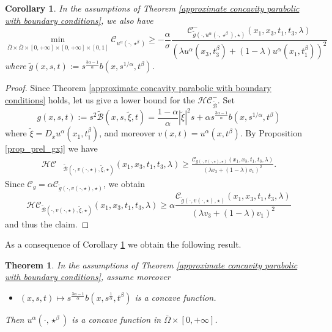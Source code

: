 \documentclass[11pt, reqno]{amsart}
\newtheorem{corollary}[lemma]{Corollary}
\newtheorem{theorem}[lemma]{Theorem}
\theoremstyle{definition}
\numberwithin{equation}{section}
\newcommand{\Omegabar}{\overline{\Omega}}
\newcommand{\Btilde}{\widetilde{\mathscr{B}}}
\begin{document}
\begin{corollary}\label{corollario con concavità}
In the assumptions of Theorem \ref{approximate concavity parabolic with boundary conditions}, we also have	
\[ \min_{\Omegabar\times \Omegabar\times[0,+\infty]\times [0,+\infty]\times[0,1]}\mathcal{C}_{u^\alpha(\cdot, \star^{\beta})} \geq-\frac{\alpha}{\sigma}\frac{\mathcal{C}^-_{\tilde{g}(\cdot, u^{\alpha}(\cdot,\star^{\beta}), \star)}(x_1,x_3,t_1,t_3,\lambda)}{(\lambda u^\alpha(x_3,t_3^{\beta})
+(1-\lambda)u^\alpha(x_1,t_1^{\beta}))^2}\]
where $\tilde{g}(x,s,t):= s^{\frac{3\alpha-1}{\alpha}}b(x,s^{1/\alpha}, t^{\beta})$.
\end{corollary}
\begin{proof}
	Since Theorem \ref{approximate concavity parabolic with boundary conditions} holds, let us give a lower bound for the $\mathcal{HC}^-_{\Btilde}$. 
	Set 
	$$g(x,s, t):=s^2\Btilde(x,s,\tilde{\xi},t)= \frac{1-\alpha}{\alpha}|\tilde{\xi}|^2s+\alpha s^{\frac{3\alpha-1}{\alpha}}b(x,s^{1/\alpha}, t^{\beta})$$ where $\tilde{\xi}=
	D_x u^{\alpha}(x_1, t_1^{\beta})$, and moreover $v(x,t) =  u^{\alpha}(x,t^{\beta})$. 
	 By Proposition \ref{prop_prel_gxj} we have
\begin{align*}
	\mathcal{HC}&_{\Btilde(\cdot,v(\cdot,\star),\tilde{\xi}, \star)}(x_1,x_3,t_1,t_3,\lambda)\geq\frac{\mathcal{C}_{g(\cdot,v(\cdot,\star), \star)}(x_1,x_3,t_1,t_3,\lambda)}{(\lambda v_3 	+(1-\lambda)v_1 )^2}.
\end{align*}
Since $\mathcal{C}_g=\alpha\mathcal{C}_{\tilde{g}(\cdot, v(\cdot, \star), \star)}$, we obtain
\[ 	\mathcal{HC}_{\Btilde(\cdot,v(\cdot,\star),\tilde{\xi}, \star)}(x_1,x_3,t_1,t_3,\lambda)\geq \alpha\frac{\mathcal{C}_{\tilde{g}(\cdot, v(\cdot, \star), \star) }(x_1,x_3,t_1,t_3,\lambda)}{(\lambda v_3 +(1-\lambda)v_1 )^2} \]
and thus the claim.
\end{proof}

As a consequence of Corollary \ref{corollario con concavità} we obtain the following result.
\begin{theorem}\label{concavity parabolic with boundary conditions}
In the assumptions of Theorem \ref{approximate concavity parabolic with boundary conditions}, assume moreover
\begin{itemize}
		\item[iv)] $(x,s,t) \mapsto s^{\frac{3\alpha-1}{\alpha}}b(x,s^{\frac{1}{\alpha}},t^{\beta}) $ is a concave function. 
\end{itemize}
Then $u^\alpha(\cdot, \star^{\beta})$ is a concave function in $\Omegabar\times [0,+\infty]$.
\end{theorem}
\end{document}
